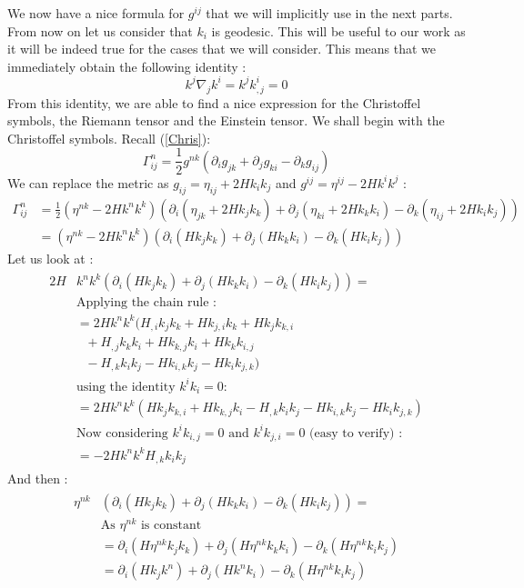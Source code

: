 \documentclass[a4paper,12pt]{article}
\theoremstyle{definition}
\begin{document}
We now have a nice formula for $g^{ij}$ that we will implicitly use in the next parts.
From now on let us consider that $k_i$ is geodesic.
This will be useful to our work as it will be indeed true for the cases that we will consider.
This means that we immediately obtain the following identity :
\begin{equation}
	k^j\nabla_jk^i=k^jk^i_{,j}=0
\end{equation}
From this identity, we are able to find a nice expression for the Christoffel symbols, the Riemann tensor and the Einstein tensor.
We shall begin with the Christoffel symbols.
Recall (\ref{Chris}):
\begin{equation}
	\Gamma^n_{ij}=\frac{1}{2}g^{nk}(\partial_i g_{jk}+\partial_j g_{ki}-\partial_k g_{ij})
\end{equation}
We can replace the metric as $g_{ij}=\eta_{ij}+2Hk_ik_j$ and $g^{ij}=\eta^{ij}-2Hk^ik^j$ :
\begin{equation}
\begin{split}
	\Gamma^n_{ij}&=\frac{1}{2}(\eta^{nk}-2Hk^nk^k)(\partial_i (\eta_{jk}+2Hk_jk_k)+\partial_j (\eta_{ki}+2Hk_kk_i)-\partial_k (\eta_{ij}+2Hk_ik_j))\\
	&=(\eta^{nk}-2Hk^nk^k)(\partial_i (Hk_jk_k)+\partial_j (Hk_kk_i)-\partial_k (Hk_ik_j))
\end{split}
\end{equation}
Let us look at :
\begin{align}
\begin{split}
	2H&k^nk^k(\partial_i (Hk_jk_k)+\partial_j (Hk_kk_i)-\partial_k (Hk_ik_j)) =\\
	&\text{Applying the chain rule :}\\
	&=2Hk^nk^k(H_{,i}k_jk_k+Hk_{j,i}k_k+Hk_jk_{k,i}\\&\text{ }+H_{,j}k_kk_i+Hk_{k,j}k_i+Hk_kk_{i,j}\\&\text{ }-H_{,k}k_ik_j-Hk_{i,k}k_j-Hk_ik_{j,k})\\
	&\text{using the identity } k^ik_i=0 :\\
	&=2Hk^nk^k(Hk_jk_{k,i}+Hk_{k,j}k_i-H_{,k}k_ik_j-Hk_{i,k}k_j-Hk_ik_{j,k})\\
	&\text{Now considering $k^ik_{i,j}=0$ and $k^ik_{j,i}=0$ (easy to verify) :}\\
	&=-2Hk^nk^kH_{,k}k_ik_j
\end{split}
\end{align}
And then :
\begin{align}
\begin{split}
	\eta^{nk}&(\partial_i (Hk_jk_k)+\partial_j (Hk_kk_i)-\partial_k (Hk_ik_j))=\\
	&\text{As $\eta^{nk}$ is constant}\\
	&=\partial_i (H\eta^{nk}k_jk_k)+\partial_j (H\eta^{nk}k_kk_i)-\partial_k (H\eta^{nk}k_ik_j)\\
	&=\partial_i (Hk_jk^n)+\partial_j (Hk^nk_i)-\partial_k (H\eta^{nk}k_ik_j)
\end{split}
\end{align}
\end{document}
